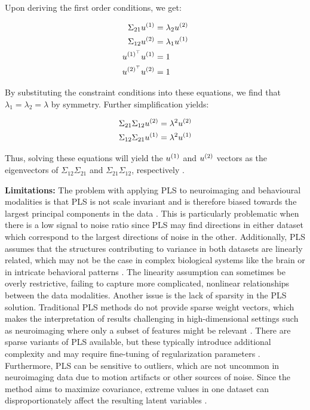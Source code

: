 Upon deriving the first order conditions, we get:

\begin{align}
    \Sigma_{21} u^{(1)} &= \lambda_2 u^{(2)} \\
    \Sigma_{12} u^{(2)} &= \lambda_1 u^{(1)} \\
    u^{(1)^{\top}}u^{(1)} &= 1 \\
    u^{(2)^{\top}}u^{(2)} &= 1
\end{align}

By substituting the constraint conditions into these equations, we find that \( \lambda_1 = \lambda_2 = \lambda \) by symmetry. Further simplification yields:

\begin{align}
    \Sigma_{21} \Sigma_{12} u^{(2)} &= \lambda^2 u^{(2)} \\
    \Sigma_{12} \Sigma_{21} u^{(1)} &= \lambda^2 u^{(1)}
\end{align}

Thus, solving these equations will yield the \( u^{(1)} \) and \( u^{(2)} \) vectors as the eigenvectors of \( \Sigma_{12} \Sigma_{21} \) and \( \Sigma_{21} \Sigma_{12} \), respectively \citep{hoskuldsson1988pls}.

\textbf{Limitations: } The problem with applying PLS to neuroimaging and behavioural modalities is that PLS is not scale invariant and
is therefore biased towards the largest principal components in the data \citep{helmer2020stability}.
This is particularly problematic when there is a low signal to noise ratio since PLS may find directions in either dataset which correspond to the largest directions of noise in the other.
Additionally, PLS assumes that the structures contributing to variance in both datasets are linearly related, which
may not be the case in complex biological systems like the brain or in intricate behavioral patterns \citep{rosipal2005overview}.
The linearity assumption can sometimes be overly restrictive, failing to capture more complicated, nonlinear relationships between the data modalities.
Another issue is the lack of sparsity in the PLS solution.
Traditional PLS methods do not provide sparse weight vectors, which makes the interpretation of results challenging in high-dimensional settings such as neuroimaging where only a subset of features might be relevant \citep{leurgans1993canonical}.
There are sparse variants of PLS available, but these typically introduce additional complexity and may require fine-tuning of regularization parameters \citep{chun2010sparse}.
Furthermore, PLS can be sensitive to outliers, which are not uncommon in neuroimaging data due to motion artifacts or other sources of noise.
Since the method aims to maximize covariance, extreme values in one dataset can disproportionately affect the resulting latent variables \citep{wold1975path}.

